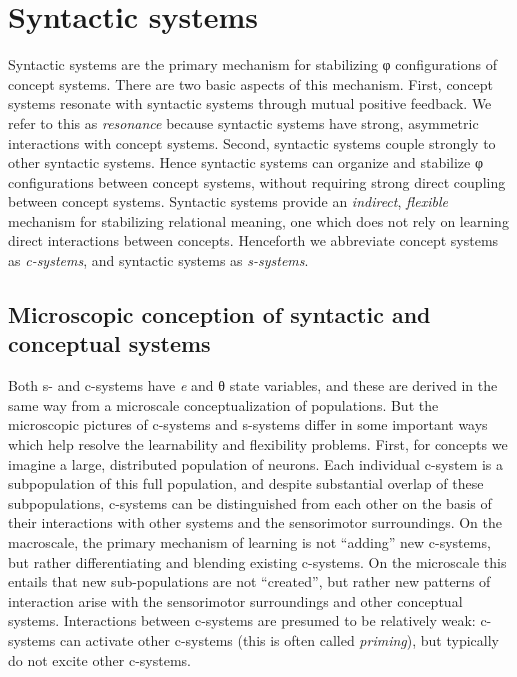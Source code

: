 \section{Syntactic systems}

Syntactic systems are the primary mechanism for stabilizing φ configurations of concept systems. There are two basic aspects of this mechanism. First, concept systems resonate with syntactic systems through mutual positive feedback. We refer to this as \textit{resonance} because syntactic systems have strong, asymmetric interactions with concept systems. Second, syntactic systems couple strongly to other syntactic systems. Hence syntactic systems can organize and stabilize φ configurations between concept systems, without requiring strong direct coupling between concept systems. Syntactic systems provide an \textit{indirect}, \textit{flexible} mechanism for stabilizing relational meaning, one which does not rely on learning direct interactions between concepts. Henceforth we abbreviate concept systems as \textit{c-systems}, and syntactic systems as \textit{s-systems}. 

\subsection{Microscopic conception of syntactic and conceptual systems}

Both s- and c-systems have \textit{e} and θ state variables, and these are derived in the same way from a microscale conceptualization of populations. But the microscopic pictures of c-systems and s-systems differ in some important ways which help resolve the learnability and flexibility problems. First, for concepts we imagine a large, distributed population of neurons. Each individual c-system is a subpopulation of this full population, and despite substantial overlap of these subpopulations, c-systems can be distinguished from each other on the basis of their interactions with other systems and the sensorimotor surroundings. On the macroscale, the primary mechanism of learning is not “adding” new c-systems, but rather differentiating and blending existing c-systems. On the microscale this entails that new sub-populations are not “created”, but rather new patterns of interaction arise with the sensorimotor surroundings and other conceptual systems. Interactions between c-systems are presumed to be relatively weak: c-systems can activate other c-systems (this is often called \textit{priming}), but typically do not excite other c-systems.

